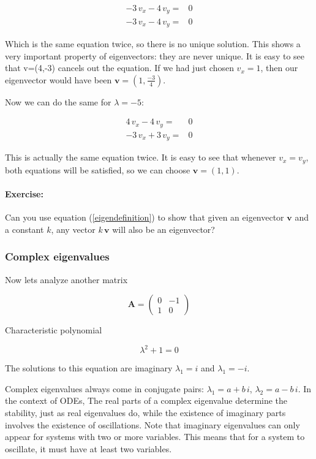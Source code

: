 \documentclass[12pt]{article}
\begin{document}
\begin{align*}
	-3 \, v_x - 4 \, v_y =& 0 \nonumber\\
	-3 \, v_x - 4 \, v_y =& 0 \nonumber
\end{align*}

Which is the same equation twice, so there is no unique solution. This shows a very important property of eigenvectors: they are never unique. It is easy to see that v=(4,-3) cancels out the equation. If we had just chosen $v_x=1$, then our eigenvector would have been $\mathbf{v}=\left( 1,\frac{-3}{4} \right)$.

Now we can do the same for  $\lambda = -5$:

\begin{align*}
	4 \, v_x - 4 \, v_y =& 0 \nonumber\\
	- 3 \, v_x  + 3 \, v_y =& 0 \nonumber
\end{align*}

This is actually the same equation twice. It is easy to see that whenever $v_x=v_y$, both equations will be satisfied, so we can choose $\mathbf{v} = (1, 1)$.

\paragraph{Exercise:} Can you use equation (\ref{eigendefinition}) to show that given an eigenvector $\mathbf{v}$ and a constant $k$, any vector $k \, \mathbf{v}$ will also be an eigenvector?

\subsubsection{Complex eigenvalues}

Now lets analyze another matrix 

\begin{equation}
	\mathbf{A}  = \begin{pmatrix} 0 & -1\\ 1 & 0\end{pmatrix}  \nonumber
\end{equation}

Characteristic polynomial

\begin{equation}
	\lambda^2 + 1 = 0 \nonumber
\end{equation}

The solutions to this equation are imaginary $\lambda_1 = i$ and $\lambda_1 = -i$.

Complex eigenvalues always come in conjugate pairs: $\lambda_1 = a + b\, i$,  $\lambda_2 = a - b\, i$. In the context of ODEs, The real parts of a complex eigenvalue determine the stability, just as real eigenvalues do, while the existence of imaginary parts involves the existence of oscillations. Note that imaginary eigenvalues can only appear for systems with two or more variables. This means that for a system to oscillate, it must have at least two variables.
\end{document}
